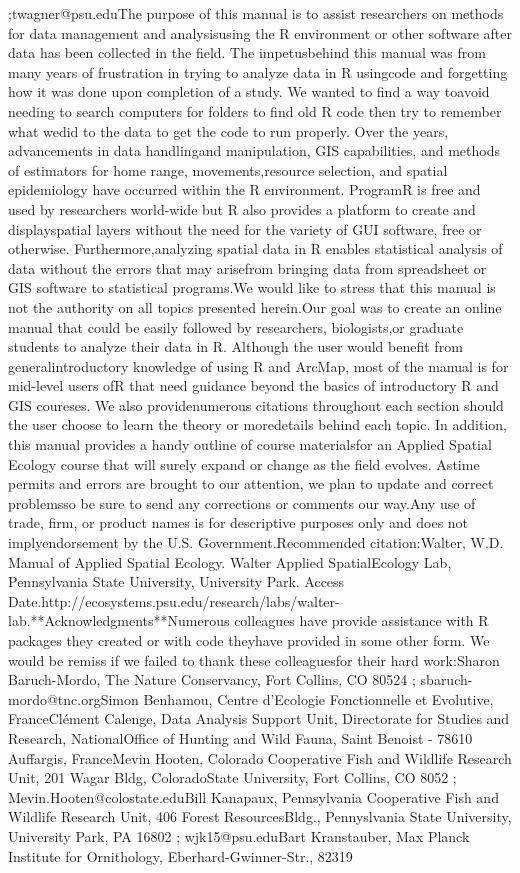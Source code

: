 \documentclass[
  letterpaper,
  DIV=11,
  numbers=noendperiod]{scrreprt}
\begin{document}
{{{;twagner@psu.edu}{The purpose of this manual is to assist researchers on methods for data management and analysisusing the R environment or other software after data has been collected in the field. The impetusbehind this manual was from many years of frustration in trying to analyze data in R usingcode and forgetting how it was done upon completion of a study. We wanted to find a way toavoid needing to search computers for folders to find old R code then try to remember what wedid to the data to get the code to run properly. Over the years, advancements in data handlingand manipulation, GIS capabilities, and methods of estimators for home range, movements,resource selection, and spatial epidemiology have occurred within the R environment. ProgramR is free and used by researchers world-wide but R also provides a platform to create and displayspatial layers without the need for the variety of GUI software, free or otherwise. Furthermore,analyzing spatial data in R enables statistical analysis of data without the errors that may arisefrom bringing data from spreadsheet or GIS software to statistical programs.We would like to stress that this manual is not the authority on all topics presented herein.Our goal was to create an online manual that could be easily followed by researchers, biologists,or graduate students to analyze their data in R. Although the user would benefit from generalintroductory knowledge of using R and ArcMap, most of the manual is for mid-level users ofR that need guidance beyond the basics of introductory R and GIS coureses. We also providenumerous citations throughout each section should the user choose to learn the theory or moredetails behind each topic. In addition, this manual provides a handy outline of course materialsfor an Applied Spatial Ecology course that will surely expand or change as the field evolves. Astime permits and errors are brought to our attention, we plan to update and correct problemsso be sure to send any corrections or comments our way.Any use of trade, firm, or product names is for descriptive purposes only and does not implyendorsement by the U.S. Government.Recommended citation:Walter, W.D. Manual of Applied Spatial Ecology. Walter Applied SpatialEcology Lab, Pennsylvania State University, University Park. Access Date.http://ecosystems.psu.edu/research/labs/walter-lab.**Acknowledgments**Numerous colleagues have provide assistance with R packages they created or with code theyhave provided in some other form. We would be remiss if we failed to thank these colleaguesfor their hard work:Sharon Baruch-Mordo, The Nature Conservancy, Fort Collins, CO 80524 ; sbaruch-mordo@tnc.orgSimon Benhamou, Centre d'Ecologie Fonctionnelle et Evolutive, FranceClément Calenge, Data Analysis Support Unit, Directorate for Studies and Research, NationalOffice of Hunting and Wild Fauna, Saint Benoist - 78610 Auffargis, FranceMevin Hooten, Colorado Cooperative Fish and Wildlife Research Unit, 201 Wagar Bldg, ColoradoState University, Fort Collins, CO 8052 ; Mevin.Hooten@colostate.eduBill Kanapaux, Pennsylvania Cooperative Fish and Wildlife Research Unit, 406 Forest ResourcesBldg., Pennyslvania State University, University Park, PA 16802 ; wjk15@psu.eduBart Kranstauber, Max Planck Institute for Ornithology, Eberhard-Gwinner-Str., 82319 }}}
\end{document}
